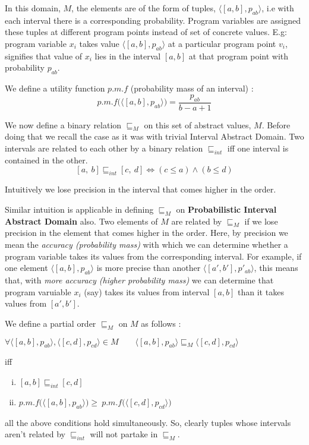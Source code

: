 \documentclass[final,3p, review, times]{util/elsarticle}
\begin{document}
In this domain, $M$, the elements are of the form of tuples, $\langle[a,b],p_{ab}\rangle$, i.e with each interval there is a corresponding probability. Program variables are assigned these tuples at different program points instead of set of concrete values. E.g: program variable $x_i$ takes value $\langle[a,b],p_{ab}\rangle$ at a particular program point $v_i$, signifies that value of $x_i$ lies in the interval $[a,b]$ at that program point with probability $p_{ab}$.

We define a utility function \underline{$\mathit{p.m.f}$} (probability mass of an interval) :
\begin{equation}
\label{eq:pmf}
p.m.f\Big(\langle[a,b],p_{ab}\rangle\Big)=\frac{p_{ab}}{b-a+1}
\end{equation}

We now define a binary relation $\sqsubseteq_M$ on this set of abstract values, $M$. Before doing that we recall the case as it was with trivial Interval Abstract Domain\cite{nielson99}. Two intervals are related to each other by a binary relation $\sqsubseteq_{int}$ iff one interval is contained in the other.
\begin{equation}\label{eq:interval_def}
[a,\ b]\sqsubseteq_{int}[c,\ d]\iff (c\leq a)\land (b\leq d)
\end{equation}

Intuitively we lose precision in the interval that comes higher in the order.

Similar intuition is applicable in defining $\sqsubseteq_M$ on \textbf{Probabilistic Interval Abstract Domain} also. Two elements of $M$ are related by $\sqsubseteq_M$ if we lose precision in the element that comes higher in the order. Here, by precision we mean the \textit{accuracy (probability mass)} with which we can determine whether a program variable takes its values from the corresponding interval. For example, if one element $\langle[a,b],p_{ab}\rangle$ is more precise than another $\langle[a',b'],p'_{ab}\rangle$, this means that, with \textit{more accuracy (higher probability mass)} we can determine that program varuiable $x_i$ (say) takes its values from interval $[a,b]$ than it takes values from $[a',b']$.

We define a partial order $\sqsubseteq_M$ on $M$ as follows :

\centerline{$\forall \langle[a,b],p_{ab}\rangle, \langle[c,d],p_{cd}\rangle\in M\qquad\langle[a,b],p_{ab}\rangle\sqsubseteq_M\langle[c,d],p_{cd}\rangle$}
iff
\begin{enumerate}[i)]
\item $[a,b]\sqsubseteq_{int}[c,d]$
\item $p.m.f\Big(\langle[a,b],p_{ab}\rangle\Big)\geq\ p.m.f\Big(\langle[c,d],p_{cd}\rangle\Big)$
\end{enumerate}
all the above conditions hold simultaneously. So, clearly tuples whose intervals aren't related by $\sqsubseteq_{int}$ will not partake in $\sqsubseteq_M$.
\end{document}
